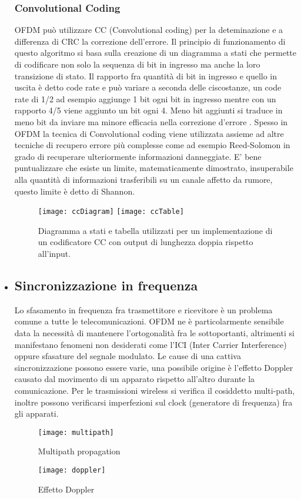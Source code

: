 \begin{itemize}
 \subsubsection{Convolutional Coding}OFDM può utilizzare CC (Convolutional coding) per la deteminazione e a differenza di CRC la correzione dell'errore. Il principio di funzionamento di questo algoritmo si basa sulla creazione di un diagramma a stati che permette di codificare non solo la sequenza di bit in ingresso ma anche la loro transizione di stato. Il rapporto fra quantità di bit in ingresso e quello in uscita è detto code rate e può variare a seconda delle ciscostanze, un code rate di 1/2 ad esempio aggiunge 1 bit ogni bit in ingresso mentre con un rapporto 4/5 viene aggiunto un bit ogni 4. Meno bit aggiunti si traduce in meno bit da inviare ma minore efficacia nella correzione d'errore \cite{cc}.
 Spesso in OFDM la tecnica di Convolutional coding viene utilizzata assieme ad altre tecniche di recupero errore più complesse come ad esempio Reed-Solomon in grado di recuperare ulteriormente informazioni danneggiate.
 E' bene puntualizzare che esiste un limite, matematicamente dimostrato, insuperabile alla quantità di informazioni trasferibili su un canale affetto da rumore, questo limite è detto di Shannon.
 \cite{ofdmWiki}
 \begin{figure}[h]
 	\centering
 	\texttt{[image: ccDiagram]}
 	\texttt{[image: ccTable]}
 	\caption{Diagramma a stati e tabella utilizzati per un implementazione di un codificatore CC con output di lunghezza doppia rispetto all'input.}\label{fig:1}
 \end{figure}
\newpage
 \item \subsection{Sincronizzazione in frequenza}
 Lo sfasamento in frequenza fra trasmettitore e ricevitore è un problema comune a tutte le telecomunicazioni. OFDM ne è particolarmente sensibile data la necessità di mantenere l'ortogonalità fra le sottoportanti, altrimenti si manifestano fenomeni non desiderati come l'ICI (Inter Carrier Interference) oppure sfasature del segnale modulato.
 Le cause di una cattiva sincronizzazione possono essere varie, una possibile origine è l'effetto Doppler causato dal movimento di un apparato rispetto all'altro durante la comunicazione. Per le trasmissioni wireless si verifica il cosiddetto multi-path, inoltre possono verificarsi imperfezioni sul clock (generatore di frequenza) fra gli apparati.
 \begin{figure}[h]
 	\centering
 	\begin{minipage}[b]{.55\columnwidth}
 		\texttt{[image: multipath]}
 		\caption{Multipath propagation \cite{ofdm-simboli}}\label{fig:1}
 	\end{minipage}\hfill
 	\begin{minipage}[b]{.35\columnwidth}
 		\texttt{[image: doppler]}
 		\caption{Effetto Doppler \cite{doppler}}\label{fig:1}
 	\end{minipage}\hfill
 \end{figure}
 

\end{itemize}
